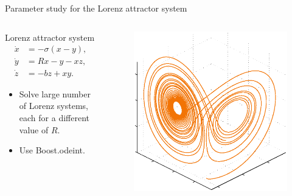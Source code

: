 \documentclass[@BEAMER_OPTIONS@]{beamer}
\begin{document}
\note{}

\begin{frame}[fragile]{Parameter study for the Lorenz attractor system}
    \begin{columns}
        \begin{column}{0.5\textwidth}
            \begin{block}{Lorenz attractor system}
                \vspace{-1\baselineskip}
                \begin{align*}
                    \dot{x} &= -\sigma \left( x - y \right), \\
                    \dot{y} &= R x - y - xz, \\
                    \dot{z} &= -bz + xy.
                    \label{eq:lorenz}
                \end{align*}
            \end{block}
            \begin{itemize}
                \item Solve large number of Lorenz systems, each
                    for a different value of $R$.
                \item Use Boost.odeint.
            \end{itemize}
        \end{column}
        \begin{column}{0.4\textwidth}
            \begin{figure}
                \begin{center}
                    \includegraphics[width=\textwidth]{lorenz}


\end{center}
\end{figure}
\end{column}
\end{columns}
\end{frame}
\end{document}
